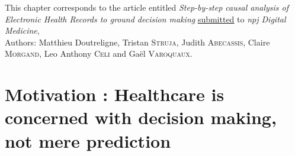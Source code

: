 \documentclass[french,12pt,twoside,a4paper]{book}
\begin{document}
\vfill
\begin{flushright}
  \begin{minipage}{15cm}
    {\small{This chapter corresponds to the article entitled \textit{Step-by-step
          causal analysis of Electronic Health Records to ground decision making}
        \underline{submitted} to \textit{npj Digital Medicine},}}\\

    {\small\hfill{} Authors: Matthieu Doutreligne, Tristan \textsc{Struja}, Judith
    \textsc{Abecassis}, Claire \textsc{Morgand}, Leo Anthony \textsc{Celi} and
    Gaël \textsc{Varoquaux}.}
  \end{minipage}
\end{flushright}

\clearpage
\minitoc

\section{Motivation : Healthcare is concerned with decision making, not mere
  prediction}%
\label{sec:causal_tuto:motivation}%


\label{subsec:causal_tuto:synthetic_materials}%
\end{document}
